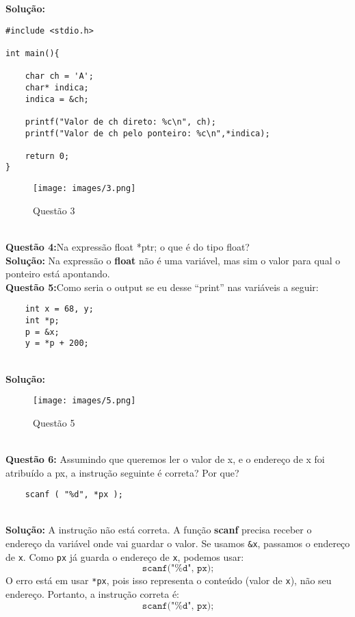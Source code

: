 \documentclass[12pt]{article}
\begin{document}
\noindent\textbf{Solução: }
\begin{lstlisting}[style=c]
#include <stdio.h>

int main(){
    
    char ch = 'A';
    char* indica;
    indica = &ch;

    printf("Valor de ch direto: %c\n", ch);
    printf("Valor de ch pelo ponteiro: %c\n",*indica);

    return 0;
}
\end{lstlisting}
\begin{figure}[h]
    \centering
    \texttt{[image: images/3.png]}
    \caption{Questão 3}
    \label{fig:placeholder}
\end{figure}
\\

\textbf{Questão 4:}Na expressão float *ptr; o que é do tipo float?
\\

\noindent\textbf{Solução:}
Na expressão o \textbf{float} não é uma variável, mas sim o valor para qual o ponteiro está apontando. 
\\

\textbf{Questão 5:}Como seria o output se eu desse “print” nas variáveis a seguir:
\begin{center}
    \begin{verbatim}
    int x = 68, y;
    int *p;
    p = &x;
    y = *p + 200;
    \end{verbatim}
\end{center}
\\

\noindent\textbf{Solução:}

\begin{figure}[h]
    \centering
    \texttt{[image: images/5.png]}
    \caption{Questão 5}
    \label{fig:placeholder}
\end{figure}
\\

\textbf{Questão 6: } Assumindo que queremos ler o valor de x, e o endereço de x foi atribuído a
px, a instrução seguinte é correta? Por que?
\begin{verbatim}
    scanf ( "%d", *px );
\end{verbatim}
\\

\noindent\textbf{Solução: }
A instrução não está correta. A função \textbf{scanf} precisa receber o endereço da variável onde vai guardar o valor.  
Se usamos \verb|&x|, passamos o endereço de \texttt{x}.  
Como \texttt{px} já guarda o endereço de \texttt{x}, podemos usar:
\[
\texttt{scanf("\%d", px);}
\]
O erro está em usar \verb|*px|, pois isso representa o conteúdo (valor de \texttt{x}), não seu endereço.  
Portanto, a instrução correta é:
\[
\texttt{scanf("\%d", px);}
\]
\\
\end{document}
